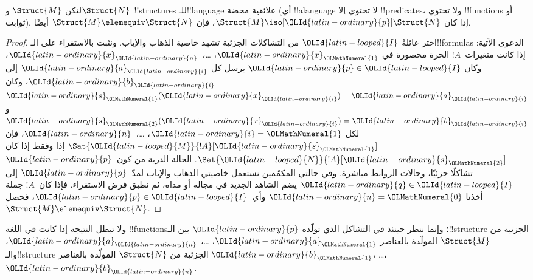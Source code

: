 \documentclass[../../../include/open-logic-section]{subfiles}
\begin{document}
\begin{thm}
  لتكن $\Struct{M}$ و$\Struct{N}$~!!{structure}s للـ!!{language} علائقية
  محضة (أي !!a{language} لا تحتوي إلا !!{predicate}s، ولا تحتوي
  !!{function}s أو ثوابت). إذا كان $\Struct{M} \iso[\OLId{latin-ordinary}{p}] \Struct{N}$،
  فإن $\Struct{M} \elemequiv \Struct{N}$ أيضًا.
\end{thm}

\begin{proof}
  اختر عائلةً $\OLId{latin-looped}{I}$ من التشاكلات الجزئية تشهد خاصية الذهاب والإياب.
  ونثبت بالاستقراء على الـ!!{formula}s الدعوى الآتية: إذا كانت
  متغيرات~$!A$ الحرة محصورة في $\OLId{latin-ordinary}{x}_\OLMathNumeral{1}$، \dots،~$\OLId{latin-ordinary}{x}_\OLId{latin-ordinary}{n}$، وكان $\OLId{latin-ordinary}{p}\in \OLId{latin-looped}{I}$
  يرسل كل $\OLId{latin-ordinary}{a}_\OLId{latin-ordinary}{i}$ إلى $\OLId{latin-ordinary}{b}_\OLId{latin-ordinary}{i}$، وكان $\OLId{latin-ordinary}{s}_\OLMathNumeral{1}(\OLId{latin-ordinary}{x}_\OLId{latin-ordinary}{i})=\OLId{latin-ordinary}{a}_\OLId{latin-ordinary}{i}$ و$\OLId{latin-ordinary}{s}_\OLMathNumeral{2}(\OLId{latin-ordinary}{x}_\OLId{latin-ordinary}{i})=\OLId{latin-ordinary}{b}_\OLId{latin-ordinary}{i}$
  لكل $\OLId{latin-ordinary}{i}=\OLMathNumeral{1}$، \dots،~$\OLId{latin-ordinary}{n}$، فإن $\Sat{\OLId{latin-looped}{M}}{!A}[\OLId{latin-ordinary}{s}_\OLMathNumeral{1}]$ إذا وفقط إذا كان
  $\Sat{\OLId{latin-looped}{N}}{!A}[\OLId{latin-ordinary}{s}_\OLMathNumeral{2}]$. الحالة الذرية من كون~$\OLId{latin-ordinary}{p}$ تشاكلًا جزئيًا،
  وحالات الروابط مباشرة. وفي حالتي المكمّمين نستعمل خاصيتي الذهاب
  والإياب لمدّ~$\OLId{latin-ordinary}{p}$ إلى $\OLId{latin-ordinary}{q}\in \OLId{latin-looped}{I}$ يضم الشاهد الجديد في مجاله أو مداه،
  ثم نطبق فرض الاستقراء. فإذا كان~$!A$ جملة أخذنا $\OLId{latin-ordinary}{n}=\OLMathNumeral{0}$ وأي~$\OLId{latin-ordinary}{p}\in \OLId{latin-looped}{I}$،
  فحصل $\Struct{M} \elemequiv \Struct{N}$.
\end{proof}

\begin{rem}
ولا تبطل النتيجة إذا كانت في اللغة !!{function}s؛ وإنما ننظر
حينئذ في التشاكل الذي تولّده $\OLId{latin-ordinary}{p}$ بين الـ!!{structure} الجزئية
من $\Struct{M}$ المولّدة بالعناصر $\OLId{latin-ordinary}{a}_\OLMathNumeral{1}$، \dots، $\OLId{latin-ordinary}{a}_\OLId{latin-ordinary}{n}$،
والـ!!{structure} الجزئية من $\Struct{N}$ المولّدة بالعناصر
$\OLId{latin-ordinary}{b}_\OLMathNumeral{1}$، \dots، $\OLId{latin-ordinary}{b}_\OLId{latin-ordinary}{n}$.
\end{rem}
\end{document}
